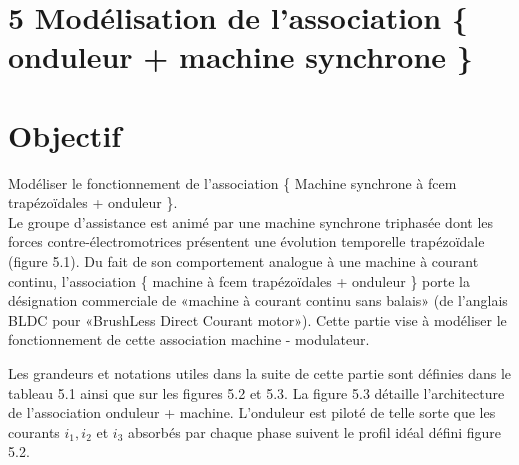 \section{5 Modélisation de l'association \{ onduleur + machine synchrone \}}
\section{Objectif}
Modéliser le fonctionnement de l'association \{ Machine synchrone à fcem trapézoïdales + onduleur \}.\\
Le groupe d'assistance est animé par une machine synchrone triphasée dont les forces contre-électromotrices présentent une évolution temporelle trapézoïdale (figure 5.1). Du fait de son comportement analogue à une machine à courant continu, l'association \{ machine à fcem trapézoïdales + onduleur \} porte la désignation commerciale de «machine à courant continu sans balais» (de l'anglais BLDC pour «BrushLess Direct Courant motor»). Cette partie vise à modéliser le fonctionnement de cette association machine - modulateur.

Les grandeurs et notations utiles dans la suite de cette partie sont définies dans le tableau 5.1 ainsi que sur les figures 5.2 et 5.3. La figure 5.3 détaille l'architecture de l'association onduleur + machine. L'onduleur est piloté de telle sorte que les courants \(i_{1}, i_{2}\) et \(i_{3}\) absorbés par chaque phase suivent le profil idéal défini figure 5.2.\\

